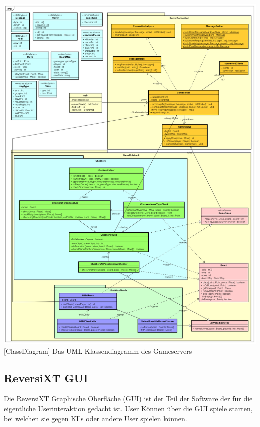 \documentclass[12pt,a4paper,bibliography=totocnumbered,listof=totocnumbered]{article}
\begin{document}
\vspace{1em}
\begin{minipage}{\linewidth}
	\centering
	\includegraphics[width=1.0\linewidth]{pics/GameServerClassDiagram.png}
	[ClassDiagram]{ Das UML Klassendiagramm des Gameservers }
	\label{fig:GameServerClassDiagram}
\end{minipage}

\subsection{ReversiXT GUI}
Die ReversiXT Graphische Oberfläche (GUI) ist der Teil der Software der für die eigentliche Userinteraktion gedacht ist. User Können über die GUI
spiele starten, bei welchen sie gegen KI's oder andere User spielen können.
\end{document}
